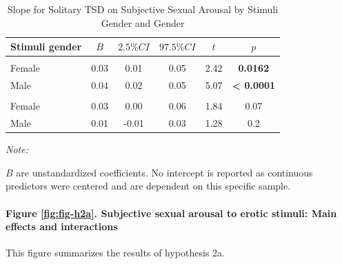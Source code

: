\documentclass[
  bookmarksnumbered]{article}
\begin{document}
\begin{table}[H]
\centering
\caption{\label{tab:unnamed-chunk-21}Slope for Solitary TSD on Subjective Sexual Arousal by Stimuli Gender and Gender}
\centering
\begin{threeparttable}
\begin{tabular}[t]{lccccc}
\toprule
Stimuli gender & $B$ & $2.5\% CI$ & $97.5\% CI$ & $t$ & $p$\\
\midrule
\addlinespace[0.3em]
\multicolumn{6}{l}{\cellcolor{lightgray}{Gender: Women}}\\
\hspace{1em}Female & 0.03 & 0.01 & 0.05 & 2.42 & \textbf{0.0162}\\
\hspace{1em}Male & 0.04 & 0.02 & 0.05 & 5.07 & \textbf{< 0.0001}\\
\addlinespace[0.3em]
\multicolumn{6}{l}{\cellcolor{lightgray}{Gender: Men}}\\
\hspace{1em}Female & 0.03 & 0.00 & 0.06 & 1.84 & 0.07\\
\hspace{1em}Male & 0.01 & -0.01 & 0.03 & 1.28 & 0.2\\
\bottomrule
\end{tabular}
\begin{tablenotes}[para]
\item \textit{Note: } 
\item $B$ are unstandardized coefficients.
    No intercept is reported as continuous predictors were centered
    and are dependent on this specific sample.
\end{tablenotes}
\end{threeparttable}
\end{table}

\paragraph{Figure \ref{fig:fig-h2a}. Subjective sexual arousal to erotic stimuli: Main effects and interactions}\label{figure-reffigfig-h2a.-subjective-sexual-arousal-to-erotic-stimuli-main-effects-and-interactions}

This figure summarizes the results of hypothesis 2a.
\end{document}
